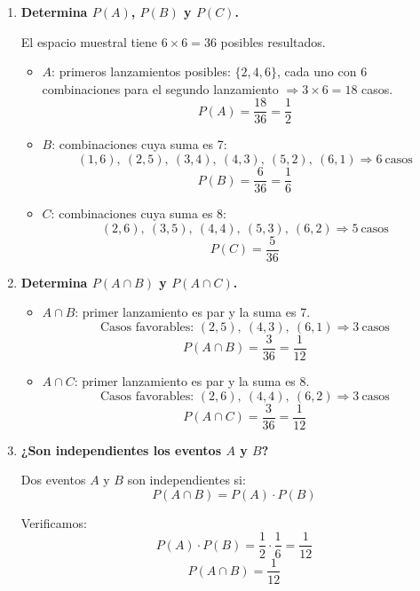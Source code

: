 \documentclass{article}
\begin{document}
\begin{enumerate}[label=\alph*)]
    \item \textbf{Determina $P(A)$, $P(B)$ y $P(C)$.}

    El espacio muestral tiene $6 \times 6 = 36$ posibles resultados.

    \begin{itemize}
        \item $A$: primeros lanzamientos posibles: $\{2, 4, 6\}$, cada uno con 6 combinaciones para el segundo lanzamiento $\Rightarrow 3 \times 6 = 18$ casos.
        \[
        P(A) = \frac{18}{36} = \frac{1}{2}
        \]

        \item $B$: combinaciones cuya suma es 7:
        \[
        (1,6),\ (2,5),\ (3,4),\ (4,3),\ (5,2),\ (6,1)
        \Rightarrow 6\ \text{casos}
        \]
        \[
        P(B) = \frac{6}{36} = \frac{1}{6}
        \]

        \item $C$: combinaciones cuya suma es 8:
        \[
        (2,6),\ (3,5),\ (4,4),\ (5,3),\ (6,2)
        \Rightarrow 5\ \text{casos}
        \]
        \[
        P(C) = \frac{5}{36}
        \]
    \end{itemize}

    \item \textbf{Determina $P(A \cap B)$ y $P(A \cap C)$.}

    \begin{itemize}
        \item $A \cap B$: primer lanzamiento es par y la suma es 7.
        \[
        \text{Casos favorables: } (2,5),\ (4,3),\ (6,1)
        \Rightarrow 3\ \text{casos}
        \]
        \[
        P(A \cap B) = \frac{3}{36} = \frac{1}{12}
        \]

        \item $A \cap C$: primer lanzamiento es par y la suma es 8.
        \[
        \text{Casos favorables: } (2,6),\ (4,4),\ (6,2)
        \Rightarrow 3\ \text{casos}
        \]
        \[
        P(A \cap C) = \frac{3}{36} = \frac{1}{12}
        \]
    \end{itemize}

    \item \textbf{¿Son independientes los eventos $A$ y $B$?}

    Dos eventos $A$ y $B$ son independientes si:
    \[
    P(A \cap B) = P(A) \cdot P(B)
    \]

    Verificamos:
    \[
    P(A) \cdot P(B) = \frac{1}{2} \cdot \frac{1}{6} = \frac{1}{12}
    \]
    \[
    P(A \cap B) = \frac{1}{12}
    \]


\end{enumerate}
\end{document}
